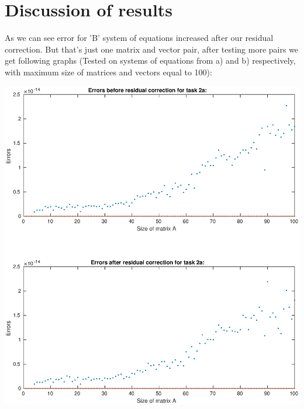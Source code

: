 \documentclass[12pt]{report}
\begin{document}
\newpage
\section{Discussion of results}
As we can see error for 'B' system of equations increased after our residual correction. But that's just one matrix and vector pair, after testing more pairs we get following graphs (Tested on systems of equations from a) and b) respectively, with maximum size of matrices and vectors equal to 100):
\begin{center}
   \includegraphics[scale=0.5]{errorsA.eps}
\end{center}
\end{document}
